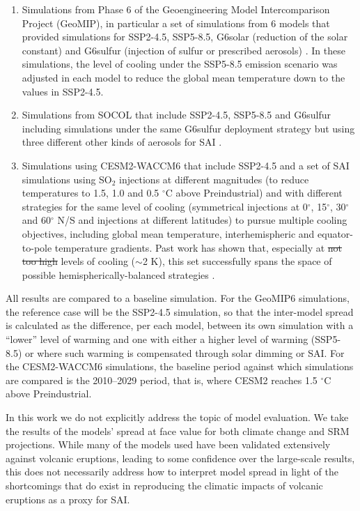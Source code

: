 \documentclass[draft]{agujournal2019}
\providecommand{\DIFadd}[1]{{\protect\color{blue}\uwave{#1}}} %
\providecommand{\DIFdel}[1]{{\protect\color{red}\sout{#1}}}                      %
\providecommand{\DIFaddbegin}{} %
\providecommand{\DIFaddend}{} %
\providecommand{\DIFdelbegin}{} %
\providecommand{\DIFdelend}{} %
\begin{document}
\begin{enumerate}
    \item Simulations from Phase 6 of the Geoengineering Model Intercomparison Project (GeoMIP), in particular a set of simulations from 6 models that provided simulations for SSP2-4.5, SSP5-8.5, G6solar (reduction of the solar constant) and G6sulfur (injection of sulfur or prescribed aerosols) \cite{Visioni2021}. In these simulations, the level of cooling under the SSP5-8.5 emission scenario was adjusted in each model to reduce the global mean temperature down to the values in SSP2-4.5.
    \item Simulations from SOCOL that include SSP2-4.5, SSP5-8.5 and G6sulfur including simulations under the same G6sulfur deployment strategy but using three different other kinds of aerosols for SAI \cite{Geurts2026}.
    \item Simulations using CESM2-WACCM6 that include SSP2-4.5 and a set of SAI simulations using SO$_2$ injections at different magnitudes (to reduce temperatures to 1.5, 1.0 and 0.5 $^{\circ}$C above Preindustrial) and with different strategies for the same level of cooling (symmetrical injections at 0$^{\circ}$, 15$^{\circ}$, 30$^{\circ}$ and 60$^{\circ}$ N/S and injections at different latitudes) to pursue multiple cooling objectives, including global mean temperature, interhemispheric and equator-to-pole temperature gradients. Past work has shown that, especially at \DIFdelbegin \DIFdel{not too high }\DIFdelend \DIFaddbegin \DIFadd{modest }\DIFaddend levels of cooling ($\sim$2 K), this set successfully spans the space of possible hemispherically-balanced strategies \cite{zhang_how_2022}.
\end{enumerate}

All results are compared to a baseline simulation. For the GeoMIP6 simulations, the reference case will be the SSP2-4.5 simulation, so that the inter-model spread is calculated as the difference, per each model, between its own simulation with a ``lower'' level of warming and one with either a higher level of warming (SSP5-8.5) or where such warming is compensated through solar dimming or SAI. For the CESM2-WACCM6 simulations, the baseline period against which simulations are compared is the 2010--2029 period, that is, where CESM2 reaches 1.5 $^{\circ}$C above Preindustrial.

In this work we do not explicitly address the topic of model evaluation. We take the results of the models' spread at face value for both climate change and SRM projections. While many of the models used have been validated extensively against volcanic eruptions, leading to some confidence over the large-scale results, this does not necessarily address how to interpret model spread in light of the shortcomings that do exist in reproducing the climatic impacts of volcanic eruptions as a proxy for SAI.
\end{document}
